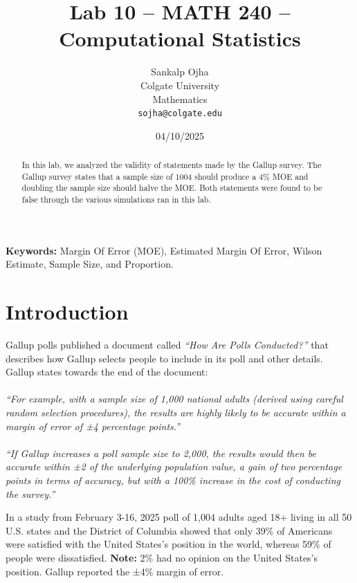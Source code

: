 \documentclass{article}\usepackage[]{graphicx}\usepackage[]{xcolor}
\begin{document}
\vspace{-1in}
\title{Lab 10 -- MATH 240 -- Computational Statistics}

\author{
  Sankalp Ojha \\
  Colgate University  \\
  Mathematics  \\
  {\tt sojha@colgate.edu}
}

\date{04/10/2025}

\maketitle

\begin{multicols}{2}
\begin{abstract}
In this lab, we analyzed the validity of statements made by the Gallup survey. The Gallup survey states that a sample size of 1004 should produce a 4\% MOE and doubling the sample size should halve the MOE. Both statements were found to be false through the various simulations ran in this lab.
\end{abstract}

\noindent \textbf{Keywords:} Margin Of Error (MOE), Estimated Margin Of Error, Wilson Estimate, Sample Size, and Proportion.

\section{Introduction}
Gallup polls published a document called \textit{“How Are Polls Conducted?”} that describes how Gallup selects people to include in its poll and other details. Gallup states towards the end of the document:
\\
\\
\textit{“For example, with a sample size of 1,000 national adults (derived using careful random selection procedures), the results are highly likely to be accurate within a margin of error of ±4 percentage points.”
\\
\\
“If Gallup increases a poll sample size to 2,000, the results would then be accurate within ±2%
of the underlying population value, a gain of two percentage points in terms of accuracy, but with a 100\% increase in the cost of conducting the survey.”}

In a study from February 3-16, 2025 poll of 1,004 adults aged 18+ living in all 50 U.S. states and the District of Columbia showed that only 39\% of Americans were satisfied with the United States's position in the world, whereas 59\% of people were dissatisfied. \textbf{Note:} 2\% had no opinion on the United States's position. Gallup reported the ±4\% margin of error.


\end{multicols}
\end{document}
